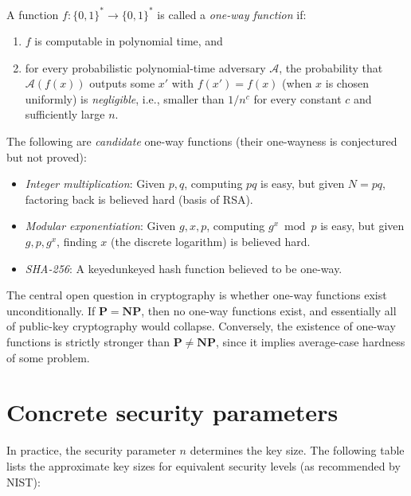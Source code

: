 \documentclass[a4paper, 12pt]{book} %
\begin{document}
\begin{definition}
    A function $f: \{0,1\}^* \longrightarrow \{0,1\}^*$ is called a \emph{one-way function} if:
    \begin{enumerate}
        \item $f$ is computable in polynomial time, and
        \item for every probabilistic polynomial-time adversary $\mathcal{A}$, the probability that $\mathcal{A}(f(x))$ outputs some $x'$ with $f(x') = f(x)$ (when $x$ is chosen uniformly) is \emph{negligible}, i.e., smaller than $1/n^c$ for every constant $c$ and sufficiently large $n$.
    \end{enumerate}
\end{definition}

\begin{example}
    The following are \emph{candidate} one-way functions (their one-wayness is conjectured but not proved):
    \begin{itemize}
        \item \emph{Integer multiplication}: Given $p, q$, computing $pq$ is easy, but given $N = pq$, factoring back is believed hard (basis of RSA).
        \item \emph{Modular exponentiation}: Given $g, x, p$, computing $g^x \bmod p$ is easy, but given $g, p, g^x$, finding $x$ (the discrete logarithm) is believed hard.
        \item \emph{SHA-256}: A keyed\/unkeyed hash function believed to be one-way.
    \end{itemize}
\end{example}

\begin{remark}
    The central open question in cryptography is whether one-way functions exist unconditionally. If $\mathbf{P} = \mathbf{NP}$, then no one-way functions exist, and essentially all of public-key cryptography would collapse. Conversely, the existence of one-way functions is strictly stronger than $\mathbf{P} \neq \mathbf{NP}$, since it implies average-case hardness of some problem.
\end{remark}

\section{Concrete security parameters}

In practice, the security parameter $n$ determines the key size. The following
table lists the approximate key sizes for equivalent security levels (as
recommended by NIST):
\end{document}
